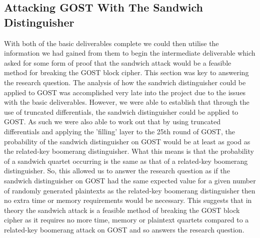 \documentclass[10pt,journal,compsoc]{IEEEtran}
\begin{document}
\subsection{Attacking GOST With The Sandwich Distinguisher}
With both of the basic deliverables complete we could then utilise the information we had gained from them to begin the intermediate deliverable which asked for some form of proof that the sandwich attack would be a feasible method for breaking the GOST block cipher. This section was key to answering the research question. The analysis of how the sandwich distinguisher could be applied to GOST was accomplished very late into the project due to the issues with the basic deliverables. However, we were able to establish that through the use of truncated differentials, the sandwich distinguisher could be applied to GOST. As such we were also able to work out that by using truncated differentials and applying the 'filling' layer to the 25th round of GOST, the probability of the sandwich distinguisher on GOST would be at least as good as the related-key boomerang distinguisher. What this means is that the probability of a sandwich quartet occurring is the same as that of a related-key boomerang distinguisher. So, this allowed us to answer the research question as if the sandwich distinguisher on GOST had the same expected value for a given number of randomly generated plaintexts as the related-key boomerang distinguisher then no extra time or memory requirements would be necessary. This suggests that in theory the sandwich attack is a feasible method of breaking the GOST block cipher as it requires no more time, memory or plaintext quartets compared to a related-key boomerang attack on GOST and so answers the research question. 
\end{document}
